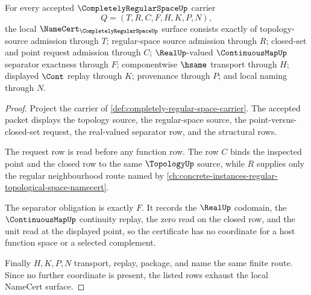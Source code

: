 \begin{theorem}
\label{thm:completely-regular-space-namecert-obligations}
For every accepted $\CompletelyRegularSpaceUp$ carrier
$$
Q=(T,R,C,F,H,K,P,N),
$$
the local $\NameCert_{\CompletelyRegularSpaceUp}$ surface consists exactly of topology-source admission through $T$; regular-space source admission through $R$; closed-set and point request admission through $C$; $\RealUp$-valued $\ContinuousMapUp$ separator exactness through $F$; componentwise $\hsame$ transport through $H$; displayed $\Cont$ replay through $K$; provenance through $P$; and local naming through $N$.
\end{theorem}
\begin{proof}
Project the carrier of \autoref{def:completely-regular-space-carrier}. The accepted packet displays the topology source, the regular-space source, the point-versus-closed-set request, the real-valued separator row, and the structural rows.

The request row is read before any function row. The row $C$ binds the inspected point and the closed row to the same $\TopologyUp$ source, while $R$ supplies only the regular neighbourhood route named by \autoref{ch:concrete-instances-regular-topological-space-namecert}.

The separator obligation is exactly $F$. It records the $\RealUp$ codomain, the $\ContinuousMapUp$ continuity replay, the zero read on the closed row, and the unit read at the displayed point, so the certificate has no coordinate for a host function space or a selected complement.

Finally $H,K,P,N$ transport, replay, package, and name the same finite route. Since no further coordinate is present, the listed rows exhaust the local NameCert surface.
\end{proof}

